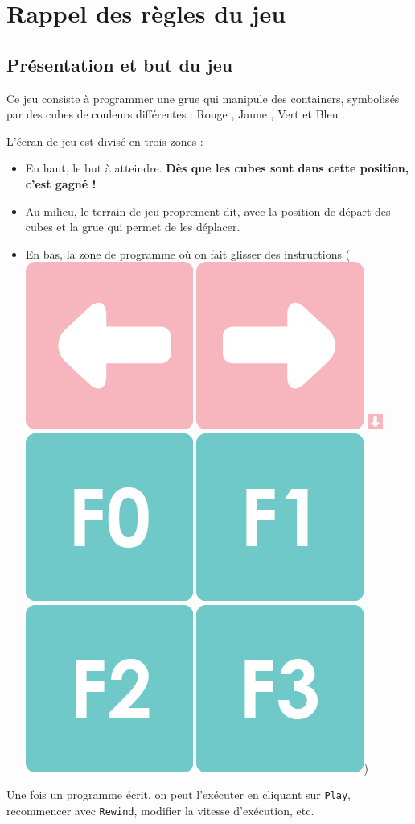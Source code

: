\documentclass[a4paper,11pt]{article}
\begin{document}
\section*{Rappel des règles du jeu}


\subsection*{Présentation et but du jeu}

Ce jeu consiste \`a programmer une grue qui manipule des containers,
symbolisés par des cubes de couleurs diff\'erentes : Rouge
, Jaune %
, Vert %
et Bleu
.

L'écran de jeu est divisé en trois zones :
\begin{itemize}
\item En haut, le but à atteindre. \textbf{Dès que les cubes sont dans
  cette position, c'est gagné !}
\item Au milieu, le terrain de jeu proprement dit, avec la position de
  départ des cubes et la grue qui permet de les déplacer.
\item En bas, la zone de programme où on fait glisser des
  instructions (\includegraphics[width
  =.5cm]{left} \includegraphics[width
  =.5cm]{right} \includegraphics[width=0.5cm]{down} \includegraphics[width
  =.5cm]{f0} \includegraphics[width=.5cm]{f1}
  \includegraphics[width=.5cm]{f2} \includegraphics[width=.5cm]{f3})
\end{itemize}

Une fois un programme écrit, on peut l'exécuter en cliquant sur
\texttt{Play}, recommencer avec \texttt{Rewind}, modifier la vitesse
d'exécution, etc.
\end{document}
